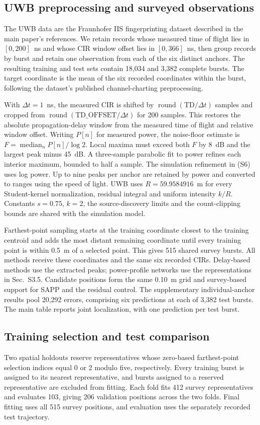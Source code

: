\documentclass[10pt]{article}
\begin{document}
\subsection{UWB preprocessing and surveyed observations}
The UWB data are the Fraunhofer IIS fingerprinting dataset described in the main paper's references. We retain records whose measured time of flight lies in $[0,200]$~ns and whose CIR window offset lies in $[0,366]$~ns, then group records by burst and retain one observation from each of the six distinct anchors. The resulting training and test sets contain 18,034 and 3,382 complete bursts. The target coordinate is the mean of the six recorded coordinates within the burst, following the dataset's published channel-charting preprocessing.

With $\Delta t=1$~ns, the measured CIR is shifted by $\operatorname{round}(\mathrm{TD}/\Delta t)$ samples and cropped from $\operatorname{round}(\mathrm{TD\_OFFSET}/\Delta t)$ for 200 samples. This restores the absolute propagation-delay window from the measured time of flight and relative window offset. Writing $P[n]$ for measured power, the noise-floor estimate is $F=\operatorname{median}_nP[n]/\log2$. Local maxima must exceed both $F$ by 8~dB and the largest peak minus 45~dB. A three-sample parabolic fit to power refines each interior maximum, bounded to half a sample. The simulation refinement in (S6) uses log power. Up to nine peaks per anchor are retained by power and converted to ranges using the speed of light. UWB uses $R=59.9584916$~m for every Student-kernel normalization, residual integral and uniform intensity $k/R$. Constants $s=0.75$, $k=2$, the source-discovery limits and the count-clipping bounds are shared with the simulation model.

Farthest-point sampling starts at the training coordinate closest to the training centroid and adds the most distant remaining coordinate until every training point is within 0.5~m of a selected point. This gives 515 shared survey bursts. All methods receive these coordinates and the same six recorded CIRs. Delay-based methods use the extracted peaks; power-profile networks use the representations in Sec.~S3.5. Candidate positions form the same 0.10~m grid and survey-based support for SAPP and the residual control. The supplementary individual-anchor results pool 20,292 errors, comprising six predictions at each of 3,382 test bursts. The main table reports joint localization, with one prediction per test burst.

\subsection{Training selection and test comparison}
Two spatial holdouts reserve representatives whose zero-based farthest-point selection indices equal 0 or 2 modulo five, respectively. Every training burst is assigned to its nearest representative, and bursts assigned to a reserved representative are excluded from fitting. Each fold fits 412 survey representatives and evaluates 103, giving 206 validation positions across the two folds. Final fitting uses all 515 survey positions, and evaluation uses the separately recorded test trajectory.
\end{document}
